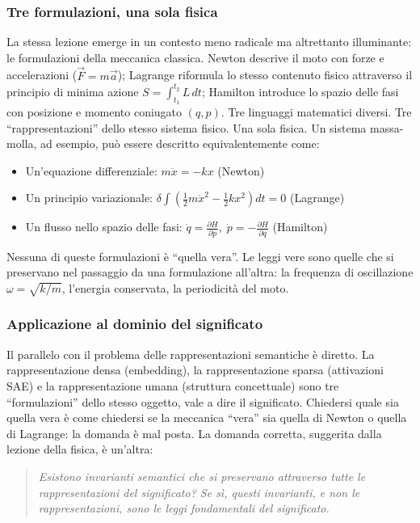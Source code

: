 \subsubsection{Tre formulazioni, una sola fisica}
\label{subsubsec:tre_formulazioni}
La stessa lezione emerge in un contesto meno radicale ma altrettanto illuminante: le formulazioni della meccanica classica. Newton descrive il moto con forze e accelerazioni ($\vec{F} = m\vec{a}$); Lagrange riformula lo stesso contenuto fisico attraverso il principio di minima azione $S = \int_{t_1}^{t_2} L\, dt$; Hamilton introduce lo spazio delle fasi con posizione e momento coniugato $(q, p)$. Tre linguaggi matematici diversi. Tre ``rappresentazioni'' dello stesso sistema fisico. Una sola fisica.
Un sistema massa-molla, ad esempio, può essere descritto equivalentemente come:
\begin{itemize}
    \item Un'equazione differenziale: $m\ddot{x} = -kx$ \hfill (Newton)
    \item Un principio variazionale: $\delta \int \left(\tfrac{1}{2}m\dot{x}^2 - \tfrac{1}{2}kx^2\right) dt = 0$ \hfill (Lagrange)
    \item Un flusso nello spazio delle fasi: $\dot{q} = \tfrac{\partial H}{\partial p},\; \dot{p} = -\tfrac{\partial H}{\partial q}$ \hfill (Hamilton)
\end{itemize}
Nessuna di queste formulazioni è ``quella vera''. Le leggi vere sono quelle che si preservano nel passaggio da una formulazione all'altra: la frequenza di oscillazione $\omega = \sqrt{k/m}$, l'energia conservata, la periodicità del moto.
\subsubsection{Applicazione al dominio del significato}
\label{subsubsec:applicazione_significato}
Il parallelo con il problema delle rappresentazioni semantiche è diretto. La rappresentazione densa (embedding), la rappresentazione sparsa (attivazioni SAE) e la rappresentazione umana (struttura concettuale) sono tre ``formulazioni'' dello stesso oggetto, vale a dire il significato. Chiedersi quale sia quella vera è come chiedersi se la meccanica ``vera'' sia quella di Newton o quella di Lagrange: la domanda è mal posta.
La domanda corretta, suggerita dalla lezione della fisica, è un'altra:
\begin{quote}
\textit{Esistono invarianti semantici che si preservano attraverso tutte le rappresentazioni del significato? Se sì, questi invarianti, e non le rappresentazioni, sono le leggi fondamentali del significato.}
\end{quote}

